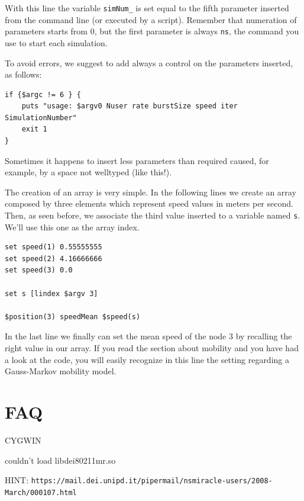 \documentclass[a4paper,10pt]{article}
\begin{document}
With this line the variable \verb=simNum_= is set equal to the fifth parameter inserted from the command line (or executed by a script). Remember that numeration of parameters starts from 0, but the first parameter is always \verb=ns=, the command you use to start each simulation.

To avoid errors, we suggest to add always a control on the parameters inserted, as follows:

\begin{verbatim}
if {$argc != 6 } {
    puts "usage: $argv0 Nuser rate burstSize speed iter SimulationNumber"
    exit 1
}
\end{verbatim}

Sometimes it happens to insert less parameters than required caused, for example, by a space not welltyped (like this!).

The creation of an array is very simple. In the following lines we create an array composed by three elements which represent speed values in meters per second. Then, as seen before, we associate the third value inserted to a variable named \verb=s=. We'll use this one as the array index.

\begin{verbatim}
set speed(1) 0.55555555
set speed(2) 4.16666666
set speed(3) 0.0

set s [lindex $argv 3]

$position(3) speedMean $speed(s)
\end{verbatim}

In the last line we finally can set the mean speed of the node 3 by recalling the right value in our array. If you read the section about mobility and you have had a look at the code, you will easily recognize in this line the setting regarding a Gauss-Markov mobility model.

\section{FAQ}

CYGWIN

couldn't load libdei80211mr.so

HINT: \texttt{https://mail.dei.unipd.it/pipermail/nsmiracle-users/2008-March/000107.html}
\end{document}
